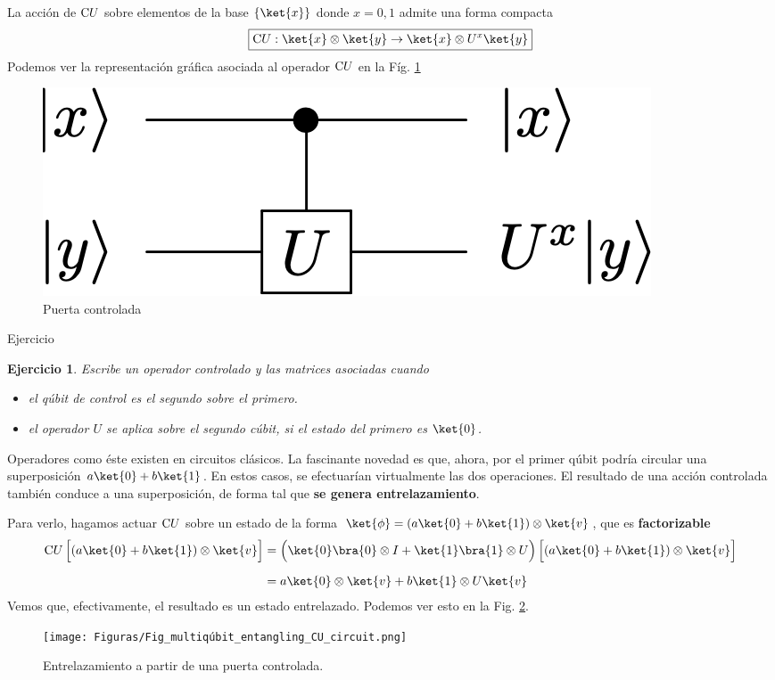 \documentclass[a4paper,11pt]{book} %
\newtheorem{ejercicio_contador}{Ejercicio}
\newcommand{\Ejercicio}[1]{
		\begin{mybox_gray}{Ejercicio} 
			\begin{ejercicio_contador}
				 #1 
			\end{ejercicio_contador} 
		\end{mybox_gray}
	}
\numberwithin{equation}{chapter}
\def\Lc{\Bigl[}
\def\Rc{\Bigr]}
\newcommand{\cg}[1]{{\rm C}#1}
\begin{document}
La acción de $\cg{U}$ sobre elementos de la base $\{\ket{x}\}$ donde $x=0,1$ admite una forma compacta 
	\begin{equation}
	\boxed{\cg{U}:\ket{x}\otimes\ket{y}  \rightarrow \ket{x} \otimes U^x\ket{y}}
	\end{equation}
Podemos ver la representación gráfica asociada al operador $\cg{U}$ en la Fíg. \ref{Fig_multiqubit_cU_gate}

	\begin{figure}[H]
	\centering 
	\includegraphics[width=0.25\linewidth]{Figuras/Fig_multiqubit_cU_gate.png}
	\caption{Puerta controlada}
	\label{Fig_multiqubit_cU_gate}
	\end{figure}
	
	\Ejercicio{
	Escribe un operador controlado y las matrices asociadas cuando  
	\begin{itemize}
		\item el qúbit de control es el segundo sobre el primero.
		\item el operador $U$ se aplica sobre el segundo cúbit, si el estado del primero es $\ket{0}$. 
	\end{itemize}
	}



Operadores como éste existen en circuitos clásicos. La fascinante novedad es que, ahora, por el primer qúbit podría circular una superposición $a\ket{0} + b\ket{1}$. En estos casos, se efectuarían virtualmente las dos operaciones. El resultado de una acción controlada también conduce a una superposición, de forma tal que \textbf{se genera entrelazamiento}. 

Para verlo, hagamos actuar $\cg{U}$ sobre un estado de la forma  $\ket{\phi} = (a\ket{0} + b\ket{1})\otimes \ket{v}$, que es \textbf{factorizable}
	\begin{align*}
	\cg{U}\,\Lc (a\ket{0} +b \ket{1})\otimes \ket{v} \Rc
	& = \left(\ket{0}\bra{0}\otimes I + \ket{1}\bra{1}\otimes U\rule{0mm}{4mm}\right) \Lc (a\ket{0} +b \ket{1})\otimes \ket{v} \Rc \\ \rule{0mm}{5mm} 
    & = a\ket{0}\otimes \ket{v} + b\ket{1}\otimes U\ket{v}
	\end{align*}
Vemos que, efectivamente, el resultado es un estado entrelazado. Podemos ver esto en la Fig. \ref{Fig_multiqúbit_entangling_CU_circuit}.

	\begin{figure}[H]
	\centering 
	\texttt{[image: Figuras/Fig\_multiqúbit\_entangling\_CU\_circuit.png]}
	\caption{Entrelazamiento a partir de una puerta controlada.}
	\label{Fig_multiqúbit_entangling_CU_circuit}
	\end{figure}
\end{document}
